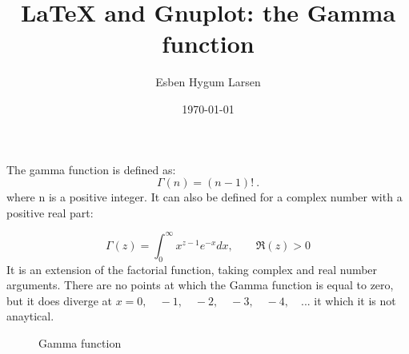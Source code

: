 \documentclass{article}
\title{\LaTeX{} and Gnuplot: the Gamma function}
\author{Esben Hygum Larsen}
\date{\today}
\begin{document}
\maketitle
The gamma function is defined as:
\begin{equation}
    \Gamma (n)=(n-1)!\ .
\end{equation}
\noindent where n is a positive integer. It can also be defined for a complex number with a positive real part:

\begin{equation}
    \Gamma (z)=\int _{0}^{\infty }x^{z-1}e^{-x} dx, \qquad \Re (z)>0
\end{equation}
\noindent It is an extension of the factorial function, taking complex and real number arguments. There are no points at which the Gamma function is equal to zero, but it does diverge at $x = 0, \quad -1, \quad -2, \quad -3, \quad -4, \quad ...$ it which it is not anaytical.


\begin{figure}
    \centering
    
    \caption{Gamma function}
\end{figure}
\end{document}
